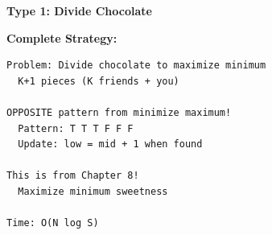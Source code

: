 \documentclass[11pt,a4paper,oneside]{book}
\begin{document}
\begin{tcolorbox}[
    enhanced,breakable,
    colback=dangered!10,
    colframe=dangered,
    boxrule=2pt,
    arc=4mm,
    title=\textbf{Complete Maximize Minimum Algorithms}
]
\textbf{Type 1: Divide Chocolate}

\textbf{Complete Strategy:}
\begin{verbatim}
Problem: Divide chocolate to maximize minimum
  K+1 pieces (K friends + you)

OPPOSITE pattern from minimize maximum!
  Pattern: T T T F F F
  Update: low = mid + 1 when found

This is from Chapter 8!
  Maximize minimum sweetness

Time: O(N log S)
\end{verbatim}
\end{tcolorbox}
\end{document}
